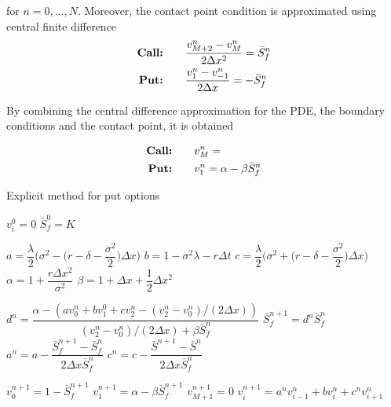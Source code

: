 for $n=0,\dots,N$. Moreover, the contact point condition is approximated using central finite difference
\begin{align}
    \label{eq:appendix:explicitmethodcompany:contact_point_approximation}
    \text{\textbf{Call:}} \qquad & \dfrac{v^{n}_{M+2} - v^{n}_{M}}{2\Delta{x}^2} = \bar{S}^{n}_{f} \\
    \text{\textbf{Put:}} \qquad & \dfrac{v^{n}_{1} - v^{n}_{-1}}{2\Delta{x}}  = -\bar{S}^{n}_{f}  
\end{align}

By combining the central difference approximation for the PDE, the boundary conditions and the contact point, it is obtained 

\begin{align*}
    \text{\textbf{Call:}} \qquad & v^{n}_{M} =  \\
    \text{\textbf{Put:}} \qquad & v^{n}_{1} = \alpha - \beta\bar{S}^{n}_{f}  
\end{align*}

\begin{algorithm}[H]
    \caption{Explicit method for put options}\label{alg:appendix:companytransformation:explicits:put_explicit_method_algorithm}
    \begin{algorithmic}
      \State $v^{0}_i = 0 $
    \EndFor
    \State $\bar{S}_{f}^{0} = K$

    \State $a = \dfrac{\lambda}{2}\bigg(\sigma^2 - \bigg(r - \delta - \dfrac{\sigma^2}{2}\bigg)\Delta{x}\bigg)$
    \State $b = 1 - \sigma^2\lambda- r\Delta{t} $
    \State $c = \dfrac{\lambda}{2}\bigg(\sigma^2 + \bigg(r - \delta - \dfrac{\sigma^2}{2}\bigg)\Delta{x}\bigg)$
    \State $\alpha = 1 + \dfrac{r\Delta{x}^2}{\sigma^2}$
    \State $\beta = 1 + \Delta{x} + \dfrac{1}{2}\Delta{x}^2$

      \State $d^n = \dfrac{\alpha - (av^{n}_{0} + bv^{0}_{1} + cv^{n}_{2} - (v^{n}_{2} - v^{n}_{0})/(2\Delta{x}))}{(v^{n}_{2} - v^{n}_{0})/(2\Delta{x}) + \beta\bar{S}^{n}_f}$
      \State $\bar{S}^{n+1}_{f}=d^{n}\bar{S}^{n}_{f}$
      \State $a^{n} = a - \dfrac{\bar{S}^{n+1}_{f} - \bar{S}^{n}_{f}}{2\Delta{x}\bar{S}^{n}_{f}}$
      \State $c^{n} = c - \dfrac{\bar{S}^{n+1} - \bar{S}^{n}}{2\Delta{x}\bar{S}^{n}_{f}}$

      \State $v^{n+1}_{0}=1 - \bar{S}^{n+1}_{f}$
      \State $v^{n+1}_{1}=\alpha - \beta\bar{S}^{n+1}_{f}$
      \State $v^{n+1}_{M+1} = 0$
        \State $v^{n+1}_{i} = a^{n} v^{n}_{i-1} + b v^{n}_{i} + c^{n}v^{n}_{i+1}$
      \EndFor
    \EndFor
  \end{algorithmic}
  \end{algorithm}
